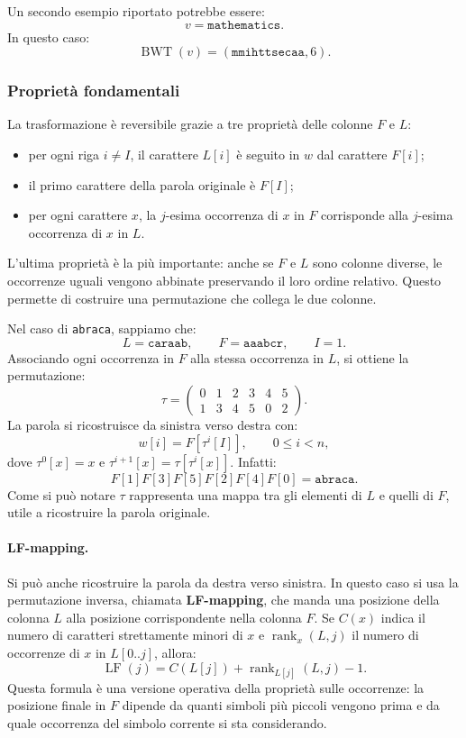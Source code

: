 \documentclass{article}
\theoremstyle{definition}
\numberwithin{equation}{section}
\begin{document}
Un secondo esempio riportato potrebbe essere:
\[
    v=\texttt{mathematics}.
\]
In questo caso:
\[
    \operatorname{BWT}(v)=(\texttt{mmihttsecaa},6).
\]

\subsubsection{Proprietà fondamentali}
La trasformazione è reversibile grazie a tre proprietà delle colonne $F$ e $L$:
\begin{itemize}
    \item per ogni riga $i\neq I$, il carattere $L[i]$ è seguito in $w$ dal carattere $F[i]$;
    \item il primo carattere della parola originale è $F[I]$;
    \item per ogni carattere $x$, la $j$-esima occorrenza di $x$ in $F$ corrisponde alla $j$-esima occorrenza di $x$ in $L$.
\end{itemize}

L'ultima proprietà è la più importante: anche se $F$ e $L$ sono colonne diverse, le occorrenze uguali vengono abbinate preservando il loro ordine relativo. Questo permette di costruire una permutazione che collega le due colonne.

Nel caso di \texttt{abraca}, sappiamo che:
\[
    L=\texttt{caraab},
    \qquad
    F=\texttt{aaabcr},
    \qquad
    I=1.
\]
Associando ogni occorrenza in $F$ alla stessa occorrenza in $L$, si ottiene la permutazione:
\[
    \tau=
    \begin{pmatrix}
        0 & 1 & 2 & 3 & 4 & 5 \\
        1 & 3 & 4 & 5 & 0 & 2
    \end{pmatrix}.
\]
La parola si ricostruisce da sinistra verso destra con:
\begin{equation}\label{eq:bwt_fl_reconstruction}
    w[i]=F[\tau^i[I]],
    \qquad
    0\leq i<n,
\end{equation}
dove $\tau^0[x]=x$ e $\tau^{i+1}[x]=\tau[\tau^i[x]]$. Infatti:
\[
    F[1]F[3]F[5]F[2]F[4]F[0]
    =
    \texttt{abraca}.
\]
Come si può notare $\tau$ rappresenta una mappa tra gli elementi di $L$ e quelli di $F$, utile a ricostruire la parola originale.

\paragraph{LF-mapping.}
Si può anche ricostruire la parola da destra verso sinistra. In questo caso si usa la permutazione inversa, chiamata \textbf{LF-mapping}, che manda una posizione della colonna $L$ alla posizione corrispondente nella colonna $F$. Se $C(x)$ indica il numero di caratteri strettamente minori di $x$ e $\operatorname{rank}_x(L,j)$ il numero di occorrenze di $x$ in $L[0..j]$, allora:
\begin{equation}\label{eq:lf_mapping_formula}
    \operatorname{LF}(j)
    =
    C(L[j])+\operatorname{rank}_{L[j]}(L,j)-1.
\end{equation}
Questa formula è una versione operativa della proprietà sulle occorrenze: la posizione finale in $F$ dipende da quanti simboli più piccoli vengono prima e da quale occorrenza del simbolo corrente si sta considerando.
\end{document}
